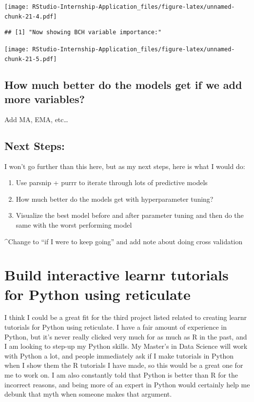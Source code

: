 \documentclass[
]{book}
\begin{document}
\texttt{[image: RStudio-Internship-Application\_files/figure-latex/unnamed-chunk-21-4.pdf]}

\begin{verbatim}
## [1] "Now showing BCH variable importance:"
\end{verbatim}

\texttt{[image: RStudio-Internship-Application\_files/figure-latex/unnamed-chunk-21-5.pdf]}

\hypertarget{how-much-better-do-the-models-get-if-we-add-more-variables}{%
\subsection{How much better do the models get if we add more variables?}\label{how-much-better-do-the-models-get-if-we-add-more-variables}}

Add MA, EMA, etc\ldots{}

\hypertarget{next-steps}{%
\subsection{Next Steps:}\label{next-steps}}

I won't go further than this here, but as my next steps, here is what I would do:

\begin{enumerate}
\def\labelenumi{\arabic{enumi}.}
\item
  Use parsnip + purrr to iterate through lots of predictive models
\item
  How much better do the models get with hyperparameter tuning?
\item
  Visualize the best model before and after parameter tuning and then do the same with the worst performing model
\end{enumerate}

\^{}Change to ``if I were to keep going'' and add note about doing cross validation

\hypertarget{build-interactive-learnr-tutorials-for-python-using-reticulate}{%
\section{Build interactive learnr tutorials for Python using reticulate}\label{build-interactive-learnr-tutorials-for-python-using-reticulate}}

I think I could be a great fit for the third project listed related to creating learnr tutorials for Python using reticulate. I have a fair amount of experience in Python, but it's never really clicked very much for as much as R in the past, and I am looking to step-up my Python skills. My Master's in Data Science will work with Python a lot, and people immediately ask if I make tutorials in Python when I show them the R tutorials I have made, so this would be a great one for me to work on. I am also constantly told that Python is better than R for the incorrect reasons, and being more of an expert in Python would certainly help me debunk that myth when someone makes that argument.
\end{document}
